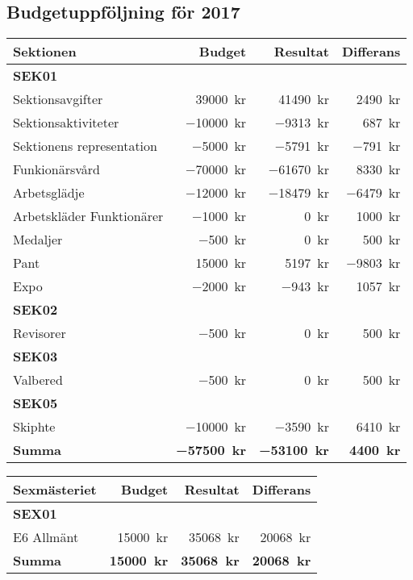 \documentclass[../_main/handlingar.tex]{subfiles}
\begin{document}
\subsection{Budgetuppföljning för 2017}

\begin{tabularx}{12cm}{X r r r}
    \textbf{\large Sektionen} & \textbf{Budget} & \textbf{Resultat} & \textbf{Differans} \\
    \hline
    \textbf{SEK01} \\
    Sektionsavgifter & \SI{39000}{kr} & \SI{41490}{kr} & \SI{2490}{kr} \\
    Sektionsaktiviteter & \SI{-10000}{kr} & \SI{-9313}{kr} & \SI{687}{kr} \\
    Sektionens representation & \SI{-5000}{kr} & \SI{-5791}{kr} & \SI{-791}{kr} \\
    Funkionärsvård & \SI{-70000}{kr} & \SI{-61670}{kr} & \SI{8330}{kr} \\
    Arbetsglädje & \SI{-12000}{kr} & \SI{-18479}{kr} & \SI{-6479}{kr} \\
    Arbetskläder Funktionärer & \SI{-1000}{kr} & \SI{0}{kr} & \SI{1000}{kr} \\
    Medaljer & \SI{-500}{kr} & \SI{0}{kr} & \SI{500}{kr} \\
    Pant & \SI{15000}{kr} & \SI{5197}{kr} & \SI{-9803}{kr} \\
    Expo & \SI{-2000}{kr} & \SI{-943}{kr} & \SI{1057}{kr} \\
    \textbf{SEK02} \\
    Revisorer & \SI{-500}{kr} & \SI{0}{kr} & \SI{500}{kr} \\
    \textbf{SEK03} \\
    Valbered & \SI{-500}{kr} & \SI{0}{kr} & \SI{500}{kr} \\
    \textbf{SEK05} \\
    Skiphte & \SI{-10000}{kr} & \SI{-3590}{kr} & \SI{6410}{kr} \\
    \hline
    \textbf{Summa} & \textbf{\SI{-57500}{kr}} & \textbf{\SI{-53100}{kr}} & \textbf{\SI{4400}{kr}} \\
\end{tabularx}

\begin{tabularx}{12cm}{X r r r}
    \textbf{\large Sexmästeriet} & \textbf{Budget} & \textbf{Resultat} & \textbf{Differans} \\
    \hline
    \textbf{SEX01} \\
    E6 Allmänt & \SI{15000}{kr} & \SI{35068}{kr} & \SI{20068}{kr} \\
    \hline
    \textbf{Summa} & \textbf{\SI{15000}{kr}} & \textbf{\SI{35068}{kr}} & \textbf{\SI{20068}{kr}} \\
\end{tabularx}
\end{document}
